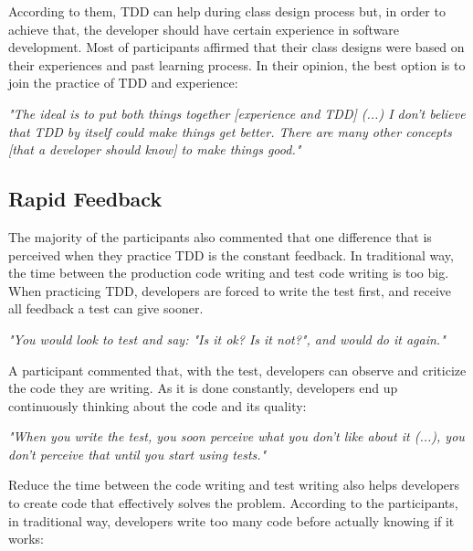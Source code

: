 \documentclass[conference]{IEEEtran}
\begin{document}
According to them, TDD can help during class design process but, in order to achieve that,
the developer should have certain experience in software development. Most of participants
affirmed that their class designs were based on their experiences and past learning process.
In their opinion, the best option is to join the practice of TDD and experience:

\begin{framed}

	\textit{"The ideal is to put both things together [experience and TDD] (...) 
	I don't believe that TDD by itself could make things get better. There are many other
	concepts [that a developer should know] to make things good."}

\end{framed}

\subsection{Rapid Feedback}

The majority of the participants also commented that one difference that is
perceived when they practice TDD is the constant feedback. In traditional way,
the time between the production code writing and test code writing is too big.
When practicing TDD, developers are forced to write the test first, and receive all
feedback a test can give sooner.

\begin{framed}
	\textit{"You would look to test and say: "Is it ok? Is it not?", and would do it again."}
\end{framed}

A participant commented that, with the test, developers can observe
and criticize the code they are writing. As it is done constantly,
developers end up continuously thinking about the code and its
quality:

\begin{framed}
	\textit{"When you write the test, you soon perceive what you don't like about it (...), 
	you don't perceive that until you start using tests."}
\end{framed}

Reduce the time between the code writing and test writing also helps developers to
create code that effectively solves the problem. According to the participants, in traditional
way, developers write too many code before actually knowing if it works:
\end{document}
